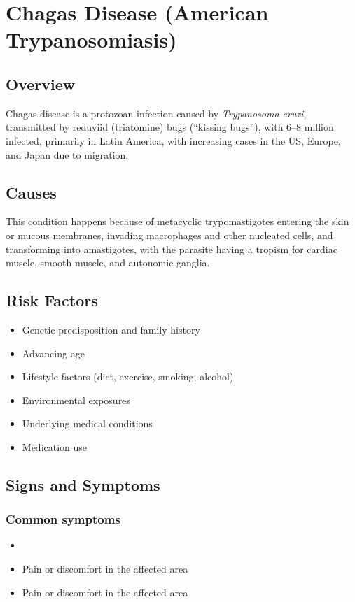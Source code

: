 \chapter{Chagas Disease (American Trypanosomiasis)}
\label{sec:Chagas Disease}

\section{Overview}
Chagas disease is a protozoan infection caused by \textit{Trypanosoma cruzi}, transmitted by reduviid (triatomine) bugs (``kissing bugs''), with 6--8 million infected, primarily in Latin America, with increasing cases in the US, Europe, and Japan due to migration.
\section{Causes}
This condition happens because of metacyclic trypomastigotes entering the skin or mucous membranes, invading macrophages and other nucleated cells, and transforming into amastigotes, with the parasite having a tropism for cardiac muscle, smooth muscle, and autonomic ganglia.     
\section{Risk Factors}

\begin{itemize}[noitemsep]
  \item Genetic predisposition and family history
  \item Advancing age
  \item Lifestyle factors (diet, exercise, smoking, alcohol)
  \item Environmental exposures
  \item Underlying medical conditions
  \item Medication use
\end{itemize}
\section{Signs and Symptoms}

\subsection{Common symptoms}
\begin{itemize}[noitemsep]
  \item \item Pain or discomfort in the affected area    \item Pain or discomfort in the affected area
  \end{itemize}

